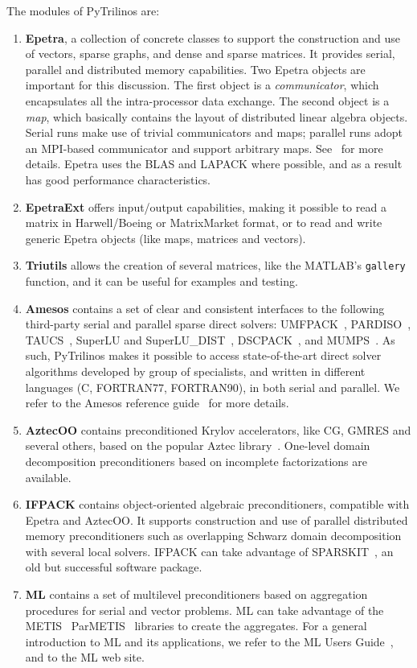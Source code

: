 \documentclass[10pt,relax]{SANDreport}
\begin{document}
The modules of PyTrilinos are:
\begin{enumerate}
\item {\bf Epetra}, a collection
of concrete classes to support the construction and use of vectors, sparse
graphs, and dense and sparse matrices. It provides serial, parallel and
distributed memory capabilities. Two Epetra objects are important for this
discussion. The first object is a {\sl communicator}, which encapsulates all
the intra-processor data exchange. The second object is a {\sl map}, which
basically contains the layout of distributed linear algebra objects. Serial
runs make use of trivial communicators and maps; parallel runs adopt an
MPI-based communicator and support arbitrary maps. See~\cite{epetra-guide} for
more details.
Epetra uses the BLAS and LAPACK where possible,
  and as a result has good performance characteristics.

%
\item {\bf EpetraExt} offers input/output
capabilities, making it possible to read a matrix in Harwell/Boeing or
MatrixMarket format, or to read and write generic Epetra objects 
(like maps, matrices and vectors).
%
\item {\bf Triutils} allows the creation of several matrices, 
  like the MATLAB's {\tt gallery} function, and it can be useful for examples
  and testing.
%
\item {\bf Amesos} contains a set of clear and consistent
interfaces to the following third-party serial and parallel sparse direct
solvers:
UMFPACK~\cite{umfpack-manual},
PARDISO~\cite{pardiso-manual},
TAUCS~\cite{taucs-manual},
SuperLU and SuperLU\_DIST~\cite{superlu-manual},
DSCPACK~\cite{dscpack-manual}, and 
MUMPS~\cite{mumps-manual}. As such, PyTrilinos makes it possible to access
state-of-the-art direct solver algorithms developed by group of specialists,
  and written in different languages (C, FORTRAN77, FORTRAN90), in both
  serial and parallel.
We refer to the Amesos reference guide~\cite{Amesos-Reference-Guide} for more details.
%
\item {\bf AztecOO} contains preconditioned Krylov accelerators,
  like CG, GMRES and several others, based on the popular Aztec
  library~\cite{aztecoo-guide}.
  One-level domain decomposition preconditioners based on incomplete
  factorizations are available.
%
\item {\bf IFPACK} contains object-oriented algebraic preconditioners, compatible with Epetra and AztecOO.
It supports construction and use of parallel distributed memory preconditioners
such as overlapping Schwarz domain decomposition with several local solvers.
IFPACK can take advantage of SPARSKIT~\cite{sparskit}, an old but successful
software package.
%
\item {\bf ML} contains a set of multilevel preconditioners based
on aggregation procedures for serial and vector problems. ML can take
advantage of the 
METIS~\cite{metis}
ParMETIS~\cite{parmetis} libraries to create the aggregates.
For a general introduction to ML and its applications, we refer to
the ML Users Guide~\cite{ml-guide}, and to the ML web site.
\end{enumerate}
\end{document}
